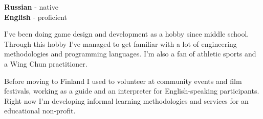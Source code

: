 \documentclass[9pt]{developercv} %
\begin{document}
\begin{minipage}[t]{0.3\textwidth}
	\vspace{-\baselineskip} %

	
	\textbf{Russian} - native\\
	\textbf{English} - proficient\\
\end{minipage}
\hfill
\begin{minipage}[t]{0.3\textwidth}
	\vspace{-\baselineskip} %
	
	
	{I've been doing game design and development as a hobby since middle school.} 
	{Through this hobby I've managed to get familiar with a lot of engineering methodologies and programming languages.}
	{I'm also a fan of athletic sports and a Wing Chun practitioner.}
\end{minipage}
\hfill
\begin{minipage}[t]{0.3\textwidth}
	\vspace{-\baselineskip} %
	
	
	{Before moving to Finland I used to volunteer at community events and film festivals, working as a guide and an interpreter for English-speaking participants.}
	{Right now I'm developing informal learning methodologies and services for an educational non-profit.}
\end{minipage}

\end{document}
